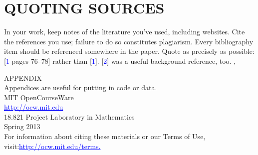 \documentclass{article}
\begin{document}
	\section{\small QUOTING SOURCES}
	In your work, keep notes of the literature you’ve used, including
	websites. Cite the references you use; failure to do so constitutes pla­giarism. Every bibliography item should be referenced somewhere in
	the paper. Quote as precisely as possible: [\textcolor{blue}{1} pages 76–78] rather than
	[\textcolor{blue}{1}]. [\textcolor{blue}{2}] was a useful background reference, too.
	\centering
	\cite{Pgurps123hello},
	\cite{Xburps123hello}
	
	
	\appendix APPENDIX\\
	Appendices are useful for putting in code or data.\\
	\vspace{2mm}
	MIT OpenCourseWare\\
	\textcolor{blue}{\underline{http://ocw.mit.edu}}\\
	\vspace{2cm}
	\large 18.821 Project Laboratory in Mathematics\\
	Spring 2013\\
	\vspace{2cm}
	For information about citing these materials or our Terms of Use, visit:\textcolor{blue}{\underline{http://ocw.mit.edu/terms.}}
\end{document}
